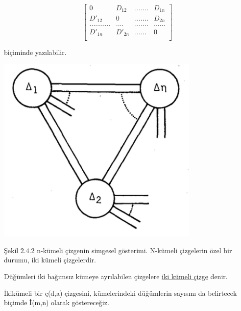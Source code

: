 \documentclass[11pt]{amsbook}
\begin{document}
\begin{equation}
\begin{bmatrix}
0 & D_{12} & ....... & D_{1n} \\
D'_{12} & 0 & ....... & D_{2n} \\
...........& .... & ....... & ...... \\
D'_{1n} & D'_{2n} & ...... & 0 \\
\end{bmatrix}
\end{equation}

bi\c{c}iminde yaz{\i}labilir.

\includegraphics[width=0.75\textwidth,height=0.35\textheight]{images/graph4}

\c{S}ekil 2.4.2 n-k\"{u}meli \c{c}izgenin simgesel g\"{o}sterimi. N-k\"{u}meli \c{c}izgelerin
\"{o}zel bir durumu, iki k\"{u}meli \c{c}izgelerdir.

\begin{definition} 
D\"{u}\u{g}\"{u}mleri iki ba\u{g}{\i}ms{\i}z k\"{u}meye ayr{\i}labilen \c{c}izgelere
\underline{iki k\"{u}meli \c{c}izge} denir.
\end{definition}

\.{I}kik\"{u}meli bir \c{c}(d,a) \c{c}izgesini, k\"{u}melerindeki d\"{u}\u{g}\"{u}mlerin say{\i}s{\i}n{\i} da belirtecek 
bi\c{c}imde \.{I}(m,n) olarak g\"{o}sterece\u{g}iz.
 
\end{document}

